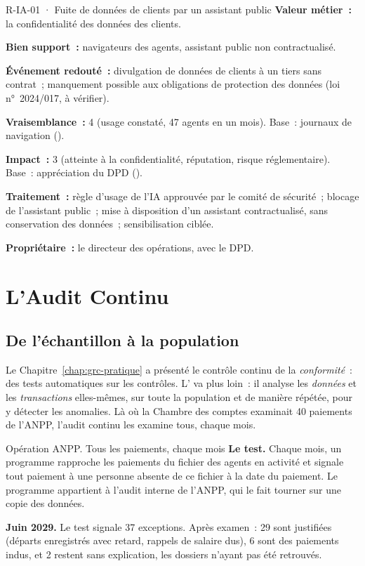 \begin{boxobjet}{R-IA-01 · Fuite de données de clients par un assistant public}
\textbf{Valeur métier~:} la confidentialité des données des clients.

\textbf{Bien support~:} navigateurs des agents, assistant public non
contractualisé.

\textbf{Événement redouté~:} divulgation de données de clients à un tiers
sans contrat~; manquement possible aux obligations de protection des
données (loi n°~2024/017, à vérifier).

\textbf{Vraisemblance~:} 4 (usage constaté, 47 agents en un mois). Base~:
journaux de navigation (\OUI{}).

\textbf{Impact~:} 3 (atteinte à la confidentialité, réputation, risque
réglementaire). Base~: appréciation du DPD (\OUI{}).

\textbf{Traitement~:} règle d'usage de l'IA approuvée par le comité de
sécurité~; blocage de l'assistant public~; mise à disposition d'un assistant
contractualisé, sans conservation des données~; sensibilisation ciblée.

\textbf{Propriétaire~:} le directeur des opérations, avec le DPD.
\end{boxobjet}

\section{L'Audit Continu}
\label{sec:c15-continu}

\subsection{De l'échantillon à la population}

Le Chapitre~\ref{chap:grc-pratique} a présenté le contrôle continu de la
\emph{conformité}~: des tests automatiques sur les contrôles. L' va plus loin~: il analyse les \emph{données}
et les \emph{transactions} elles-mêmes, sur toute la population et de
manière répétée, pour y détecter les anomalies. Là où la Chambre des
comptes examinait 40 paiements de l'ANPP, l'audit continu les examine tous,
chaque mois.

\begin{boxscenario}{Opération ANPP. Tous les paiements, chaque mois}
\textbf{Le test.} Chaque mois, un programme rapproche les paiements du
fichier des agents en activité et signale tout paiement à une personne
absente de ce fichier à la date du paiement. Le programme appartient à
l'audit interne de l'ANPP, qui le fait tourner sur une copie des données.

\medskip
\textbf{Juin 2029.} Le test signale 37 exceptions. Après examen~: 29 sont
justifiées (départs enregistrés avec retard, rappels de salaire dus), 6 sont
des paiements indus, et 2 restent sans explication, les dossiers n'ayant pas
été retrouvés.
\end{boxscenario}

